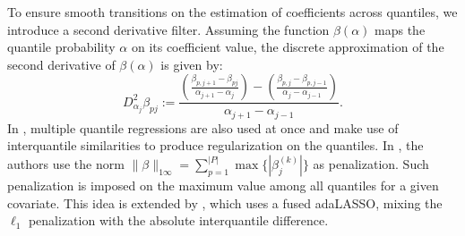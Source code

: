 To ensure smooth transitions on the estimation of coefficients across quantiles, we introduce a second derivative filter. Assuming the function $\beta(\alpha)$ maps the quantile probability $\alpha$ on its coefficient value, the discrete approximation of the second derivative of $\beta(\alpha)$ is given by:
\begin{equation}
D_{\alpha_j}^{2} \beta_{pj} := \frac{\left(\frac{\beta_{p,j+1}-\beta_{pj}}{\alpha_{j+1}-\alpha_{j}}\right)-\left(\frac{\beta_{p,j}-\beta_{p,j-1}}{\alpha_{j}-\alpha_{j-1}}\right)}{\alpha_{j+1}-\alpha_{j-1}}. 
\end{equation}
In \cite{zou_regularized_2008, jiang_interquantile_2014}, multiple quantile regressions are also used at once and make use of interquantile similarities to produce regularization on the quantiles. In \cite{zou_regularized_2008}, the authors use the norm $\| \beta \|_{1\infty}=\sum_{p=1}^{|P|} \max\{ |\beta_j^{(k)} |\}$ as penalization. Such penalization is imposed on the maximum value among all quantiles for a given covariate. This idea is extended by \cite{jiang_interquantile_2014}, which uses a fused adaLASSO, mixing the $\ell_1$ penalization with the absolute interquantile difference.

